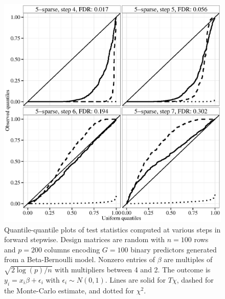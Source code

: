\documentclass[oupdraft]{bio}
\begin{document}
\begin{figure}
\begin{center}
\includegraphics[width=.9\textwidth]{nonnull_G100_high4_binary.eps}
\caption{Quantile-quantile plots of test statistics computed at various steps in forward stepwise. Design matrices are random with $n = 100$ rows and $p = 200$ columns encoding $G = 100$ binary predictors generated from a Beta-Bernoulli model. Nonzero entries of $\beta$ are multiples of $\sqrt{2 \log (p)/n}$ with multipliers between 4 and 2. The outcome is $y_i = x_i\beta + \epsilon_i$ with $\epsilon_i \sim N(0,1)$. Lines are solid for $T\chi$, dashed for the Monte-Carlo estimate, and dotted for $\chi^2$.}
\label{fig:binary}
\end{center}
\end{figure}
\end{document}
